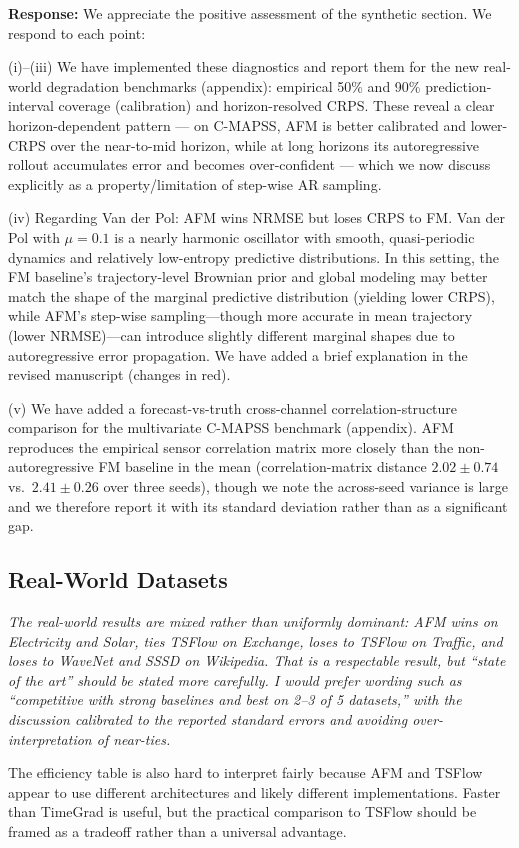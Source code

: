 \documentclass[11pt]{article}
\newcommand{\reviewertext}[1]{%
  \begin{reviewerquote}
    {\color{reviewercolor}\itshape #1}
  \end{reviewerquote}%
}
\newcommand{\authorresponse}[1]{%
  \textbf{Response:} #1\par\medskip
}
\begin{document}
\authorresponse{%
We appreciate the positive assessment of the synthetic section. We respond to each point:

(i)--(iii) We have implemented these diagnostics and report them for the new real-world degradation benchmarks (appendix): empirical 50\% and 90\% prediction-interval coverage (calibration) and horizon-resolved CRPS. These reveal a clear horizon-dependent pattern --- on C-MAPSS, AFM is better calibrated and lower-CRPS over the near-to-mid horizon, while at long horizons its autoregressive rollout accumulates error and becomes over-confident --- which we now discuss explicitly as a property/limitation of step-wise AR sampling.

(iv) Regarding Van der Pol: AFM wins NRMSE but loses CRPS to FM. Van der Pol with $\mu=0.1$ is a nearly harmonic oscillator with smooth, quasi-periodic dynamics and relatively low-entropy predictive distributions. In this setting, the FM baseline's trajectory-level Brownian prior and global modeling may better match the shape of the marginal predictive distribution (yielding lower CRPS), while AFM's step-wise sampling---though more accurate in mean trajectory (lower NRMSE)---can introduce slightly different marginal shapes due to autoregressive error propagation. We have added a brief explanation in the revised manuscript (changes in red).

(v) We have added a forecast-vs-truth cross-channel correlation-structure comparison for the multivariate C-MAPSS benchmark (appendix). AFM reproduces the empirical sensor correlation matrix more closely than the non-autoregressive FM baseline in the mean (correlation-matrix distance $2.02\!\pm\!0.74$ vs.\ $2.41\!\pm\!0.26$ over three seeds), though we note the across-seed variance is large and we therefore report it with its standard deviation rather than as a significant gap.
}

\subsection{Real-World Datasets}

\reviewertext{%
The real-world results are mixed rather than uniformly dominant: AFM wins on Electricity and Solar, ties TSFlow on Exchange, loses to TSFlow on Traffic, and loses to WaveNet and SSSD on Wikipedia. That is a respectable result, but ``state of the art'' should be stated more carefully. I would prefer wording such as ``competitive with strong baselines and best on 2--3 of 5 datasets,'' with the discussion calibrated to the reported standard errors and avoiding over-interpretation of near-ties.

The efficiency table is also hard to interpret fairly because AFM and TSFlow appear to use different architectures and likely different implementations. Faster than TimeGrad is useful, but the practical comparison to TSFlow should be framed as a tradeoff rather than a universal advantage.
}
\end{document}

